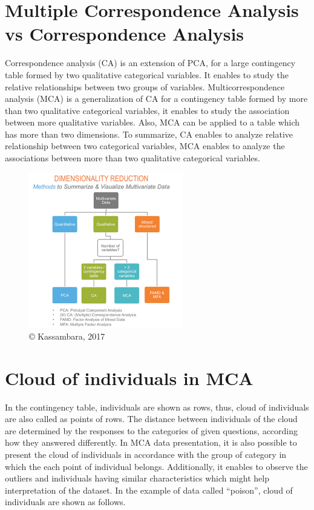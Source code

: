 \documentclass[]{book}
\begin{document}
\hypertarget{multiple-correspondence-analysis-vs-correspondence-analysis}{%
\section{Multiple Correspondence Analysis vs Correspondence Analysis}\label{multiple-correspondence-analysis-vs-correspondence-analysis}}

Correspondence analysis (CA) is an extension of PCA, for a large contingency table formed by two qualitative categorical variables. It enables to study the relative relationships between two groups of variables. Multicorrespondence analysis (MCA) is a generalization of CA for a contingency table formed by more than two qualitative categorical variables, it enables to study the association between more qualitative variables. Also, MCA can be applied to a table which has more than two dimensions.
To summarize, CA enables to analyze relative relationship between two categorical variables, MCA enables to analyze the associations between more than two qualitative categorical variables.

\begin{figure}
\centering
\includegraphics[width=0.6\textwidth,height=\textheight]{MCA,CA.png}
\caption{© Kassambara, 2017}
\end{figure}

\hypertarget{cloud-of-individuals-in-mca}{%
\section{Cloud of individuals in MCA}\label{cloud-of-individuals-in-mca}}

In the contingency table, individuals are shown as rows, thus, cloud of individuals are also called as points of rows. The distance between individuals of the cloud are determined by the responses to the categories of given questions, according how they answered differently. In MCA data presentation, it is also possible to present the cloud of individuals in accordance with the group of category in which the each point of individual belongs. Additionally, it enables to observe the outliers and individuals having similar characteristics which might help interpretation of the dataset.
In the example of data called ``poison'', cloud of individuals are shown as follows.
\end{document}
